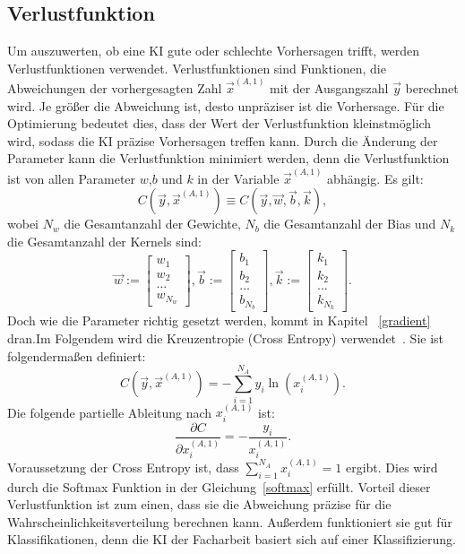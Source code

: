 \documentclass[11pt]{article}
\begin{document}
\subsection{Verlustfunktion}\label{lost}
Um auszuwerten, ob eine KI gute oder schlechte Vorhersagen trifft, werden Verlustfunktionen verwendet.
Verlustfunktionen sind Funktionen, die Abweichungen der vorhergesagten Zahl $\vec{x}^{(A,1)}$ mit der Ausgangszahl $\vec{y}$ berechnet wird. %
Je größer die Abweichung ist, desto unpräziser ist die Vorhersage. Für die
Optimierung bedeutet dies, dass der Wert der Verlustfunktion kleinstmöglich wird, sodass die KI präzise Vorhersagen treffen kann. Durch die Änderung der Parameter
kann die Verlustfunktion minimiert werden, denn die Verlustfunktion ist von allen Parameter $w$,$b$ und $k$ in der Variable $\vec{x}^{(A,1)}$ abhängig.
Es gilt:
\begin{equation}
    C(\vec{y},\vec{x}^{(A,1)}) \equiv C(\vec{y},\vec{w},\vec{b},\vec{k}),
\end{equation}
 wobei $N_w$ die Gesamtanzahl der Gewichte, $N_b$ die Gesamtanzahl der Bias und $N_k$ die Gesamtanzahl der Kernels sind:
\begin{equation}
    \vec{w} := \begin{bmatrix} w_{1} \\ w_{2} \\ \ldots \\ w_{N_w} \end{bmatrix},
    \vec{b} := \begin{bmatrix} b_{1} \\ b_{2} \\ \ldots \\ b_{N_b} \end{bmatrix},
    \vec{k} := \begin{bmatrix} k_{1} \\ k_{2} \\ \ldots \\ k_{N_k} \end{bmatrix}.
\end{equation}
Doch wie die Parameter richtig gesetzt werden, kommt in Kapitel
~\ref{gradient} dran.\@ Im Folgendem wird die Kreuzentropie (Cross Entropy) verwendet~\cite{19}. Sie ist folgendermaßen definiert:
\begin{equation}
    C(\vec{y},\vec{x}^{(A,1)}) = -\sum_{i=1}^{N_A} y_i \ln(x_i^{(A,1)}).
\end{equation}
Die folgende partielle Ableitung nach $x_i^{(A,1)}$ ist:
\begin{equation}
    \frac{\partial C}{\partial x_i^{(A,1)}} = -\frac{y_i}{x_i^{(A,1)}}.
\end{equation}
Voraussetzung der Cross Entropy ist, dass $\sum_{i=1}^{N_A} x_i^{(A,1)} = 1$ ergibt. Dies wird durch die Softmax Funktion in der Gleichung~\ref{softmax} erfüllt.
Vorteil dieser Verlustfunktion ist zum einen, dass sie die Abweichung präzise für die Wahrscheinlichkeitsverteilung berechnen kann.
Außerdem funktioniert sie gut für Klassifikationen, denn die KI der Facharbeit basiert sich auf einer Klassifizierung. %
\end{document}
